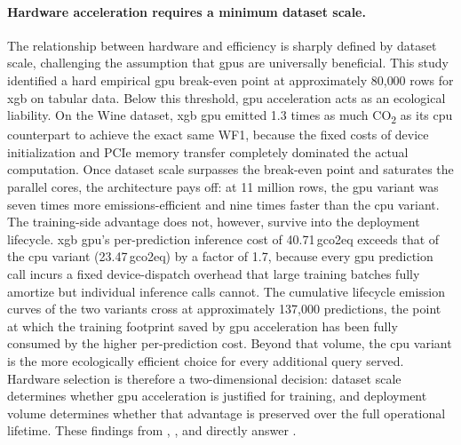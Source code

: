 \paragraph{Hardware acceleration requires a minimum dataset scale.}
The relationship between hardware and efficiency is sharply defined by dataset scale, challenging the assumption that \glspl{gpu} are universally beneficial. This study identified a hard empirical \gls{gpu} break-even point at approximately 80{,}000 rows for \gls{xgb} on tabular data. Below this threshold, \gls{gpu} acceleration acts as an ecological liability. On the Wine dataset, \gls{xgb} \gls{gpu} emitted 1.3 times as much CO\textsubscript{2} as its \gls{cpu} counterpart to achieve the exact same WF1, because the fixed costs of device initialization and PCIe memory transfer completely dominated the actual computation. Once dataset scale surpasses the break-even point and saturates the parallel cores, the architecture pays off: at 11 million rows, the \gls{gpu} variant was seven times more emissions-efficient and nine times faster than the \gls{cpu} variant. The training-side advantage does not, however, survive into the deployment lifecycle. \gls{xgb} \gls{gpu}'s per-prediction inference cost of 40.71\,\textmu\gls{gco2eq} exceeds that of the \gls{cpu} variant (23.47\,\textmu\gls{gco2eq}) by a factor of 1.7, because every \gls{gpu} prediction call incurs a fixed device-dispatch overhead that large training batches fully amortize but individual inference calls cannot. The cumulative lifecycle emission curves of the two variants cross at approximately 137{,}000 predictions, the point at which the training footprint saved by \gls{gpu} acceleration has been fully consumed by the higher per-prediction cost. Beyond that volume, the \gls{cpu} variant is the more ecologically efficient choice for every additional query served. Hardware selection is therefore a two-dimensional decision: dataset scale determines whether \gls{gpu} acceleration is justified for training, and deployment volume determines whether that advantage is preserved over the full operational lifetime. These findings from , , and  directly answer .

